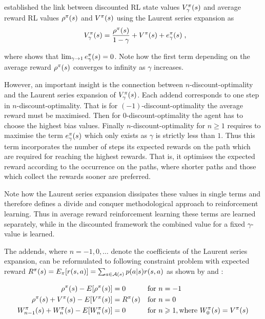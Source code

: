 \documentclass[envcountsame]{llncs}
\begin{document}
\cite{MillerVeinott1969} established the link between discounted RL state values
\(V_{\gamma}^{\pi}(s)\) and average reward RL values \(\rho^{\pi}(s)\) and \(V^{\pi}(s)\)
using the Laurent series expansion as
\begin{align*}
  V_{\gamma}^{\pol}(s) = \frac{\avgrew^{\pol}(s)}{1-\gamma} + V^{\pol}(s) + e_{\gamma}^{\pol}(s) \tcom
\end{align*}


where \cite{Puterman94} shows that \(\lim_{\gamma \to 1} e_{\gamma}^{\pi}(s) = 0\). Note how the
first term depending on the average reward \(\rho^{\pi}(s)\) converges to infinity as \(\gamma\)
increases.


However, an important insight is the connection between \(n\)-discount-optimality and the Laurent
series expansion of \(V_{\gamma}^{\pi}(s)\). Each addend corresponds to one step in
\(n\)-discount-optimality. That is for \((-1)\)-discount-optimality the average reward must be
maximised.
%
Then for \(0\)-discount-optimality the agent has to choose the highest bias values.
%
Finally \(n\)-discount-optimality for \(n \geqslant 1\) requires to maximise the term
\(e_{\gamma}^{\pi}(s)\) which only exists as \(\gamma\) is strictly less than \(1\). Thus this term
incorporates the number of steps its expected rewards on the path which are required for reaching
the highest rewards. That is, it optimises the expected reward according to the occurrence on the
paths, where shorter paths and those which collect the rewards sooner are preferred.

Note how the Laurent series expansion dissipates these values in single terms and therefore defines
a divide and conquer methodological approach to reinforcement learning. Thus in average reward
reinforcement learning these terms are learned separately, while in the discounted framework the
combined value for a fixed \(\gamma\)-value is learned.

The addends, where \(n=-1,0,\ldots\) denote the coefficients of the Laurent series expansion,
can be reformulated to following constraint problem with expected reward
\(R^{\pi}(s) = E_{\pi}[ r(s, a) ] = \sum_{a \in \mathcal{A}(s)}p(a | s) r(s, a)\) as shown by
\cite{MillerVeinott1969} and \citet[p.346]{Puterman94}:

\begin{align}
  \label{eq:constr1}\rho^{\pi}(s) - E[\rho^{\pi}(s)] & = 0 &  & \text{for } n = -1 \\
  \label{eq:constr2}\rho^{\pi}(s) + V^{\pi}(s) - E[V^{\pi}(s)] & = R^{\pi}(s) && \text{for } n = 0 \\
  \label{eq:constr3}W^{\pi}_{n-1}(s) + W^{\pi}_{n}(s) - E[W^{\pi}_{n}(s)] & = 0 && \text{for } n \geqslant 1, \text{where } W_{0}^{\pi}(s) = V^{\pi}(s)
\end{align}
\end{document}
